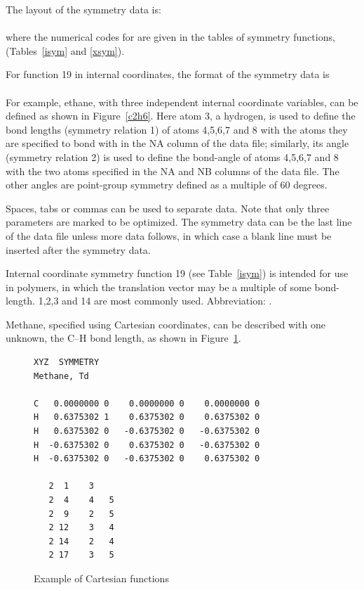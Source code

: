 The layout of the symmetry data is:
\\
\\
where the numerical codes for  are given
in the tables of symmetry functions, (Tables~\ref{isym} and \ref{xsym}).

For function 19 in internal coordinates, the format of the symmetry data is
\\
\\

For example,  ethane,  with  three  independent  internal coordinate
variables,  can  be defined as shown in Figure~\ref{c2h6}. Here atom 3,  a
hydrogen,  is  used  to  define  the  bond  lengths (symmetry  relation  1)
of  atoms  4,5,6,7 and 8 with the atoms they are specified to bond with in the
NA column of the data file; similarly,  its angle  (symmetry  relation  2)  is
used to define the bond-angle of atoms 4,5,6,7 and 8 with the two atoms
specified in the NA and  NB  columns  of the  data  file.   The other angles
are point-group symmetry defined as a multiple of 60 degrees.

Spaces, tabs or commas can be used to separate data.  Note that only three
parameters  are  marked to be optimized.  The symmetry data can be the last
line of the data file unless more data follows, in which case  a blank line
must be inserted after the symmetry data.


Internal coordinate symmetry function  19  (see Table~\ref{isym})  is
intended  for  use  in   polymers,  in  which   the translation  vector  may be
a multiple of some bond-length.  1,2,3 and 14 are most commonly used.
Abbreviation:  .


Methane, specified using Cartesian coordinates, can be described with
one unknown, the C--H bond length, as shown in Figure~\ref{xch4}.

\begin{figure}
\begin{makeimage}
\end{makeimage}
\begin{verbatim}
XYZ  SYMMETRY
Methane, Td

C   0.0000000 0    0.0000000 0    0.0000000 0
H   0.6375302 1    0.6375302 0    0.6375302 0
H   0.6375302 0   -0.6375302 0   -0.6375302 0
H  -0.6375302 0    0.6375302 0   -0.6375302 0
H  -0.6375302 0   -0.6375302 0    0.6375302 0

   2  1    3
   2  4    4   5
   2  9    2   5
   2 12    3   4
   2 14    2   4
   2 17    3   5
\end{verbatim}
\caption{\label{xch4} Example of Cartesian  functions}
\end{figure}

